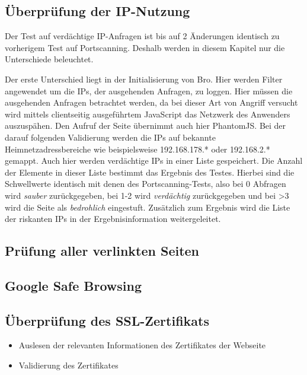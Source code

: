 \subsection{Überprüfung der IP-Nutzung}
Der Test auf verdächtige IP-Anfragen ist bis auf 2 Änderungen identisch zu vorherigem Test auf Portscanning. Deshalb werden in diesem Kapitel nur die Unterschiede beleuchtet.

Der erste Unterschied liegt in der Initialisierung von Bro. Hier werden Filter angewendet um die IPs, der ausgehenden Anfragen, zu loggen. Hier müssen die ausgehenden Anfragen betrachtet werden, da bei dieser Art von Angriff versucht wird mittels clientseitig ausgeführtem JavaScript das Netzwerk des Anwenders auszuspähen. Den Aufruf der Seite übernimmt auch hier PhantomJS. Bei der darauf folgenden Validierung werden die IPs auf bekannte Heimnetzadressbereiche wie beispielsweise 192.168.178.* oder 192.168.2.* gemappt. Auch hier werden verdächtige IPs in einer Liste gespeichert. Die Anzahl der Elemente in dieser Liste bestimmt das Ergebnis des Testes. Hierbei sind die Schwellwerte identisch mit denen des Portscanning-Tests, also bei 0 Abfragen wird \textit{sauber} zurückgegeben, bei 1-2 wird \textit{verdächtig} zurückgegeben und bei >3 wird die Seite als \textit{bedrohlich} eingestuft. Zusätzlich zum Ergebnis wird die Liste der riskanten IPs in der Ergebnisinformation weitergeleitet.

\subsection{Prüfung aller verlinkten Seiten}


\subsection{Google Safe Browsing}


\subsection{Überprüfung des SSL-Zertifikats}


\begin{itemize}
  \item Auslesen der relevanten Informationen des Zertifikates der Webseite
  \item Validierung des Zertifikates
\end{itemize}

